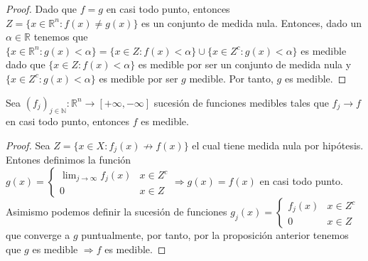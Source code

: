 \begin{proof}
    Dado que $f = g$ en casi todo punto, entonces $ Z = \{x \in \mathbb{R}^n : f(x) \neq g(x)\}$ es un conjunto de medida nula. Entonces, dado un $\alpha \in \mathbb{R}$ tenemos que $\{x \in \mathbb{R}^n : g(x) < \alpha\} = \{x \in Z : f(x) < \alpha\} \cup \{x \in Z^c : g(x) < \alpha\}$ es medible dado que $\{x \in Z : f(x) < \alpha\}$ es medible por ser un conjunto de medida nula y $\{x \in Z^c : g(x) < \alpha\}$ es medible por ser $g$ medible. Por tanto, $g$ es medible.
\end{proof}

\begin{corolario}
    Sea $(f_j)_{j \in \mathbb{N}}: \mathbb{R}^n \to [+\infty, -\infty]$ sucesión de funciones medibles tales que $f_j \to f$ en casi todo punto, entonces $f$ es medible.
\end{corolario}
\begin{proof}
    Sea $Z = \{x \in X : f_j(x) \not\to f(x)\}$ el cual tiene medida nula por hipótesis. Entones definimos la función $g(x) = \begin{cases} \lim_{j \to \infty}f_j(x) & x \in Z^c \\ 0 & x \in Z \end{cases} \Rightarrow g(x) = f(x)$ en casi todo punto. Asimismo podemos definir la sucesión de funciones $g_j(x) = \begin{cases} f_j(x) & x \in Z^c \\ 0 & x \in Z \end{cases}$ que converge a $g$ puntualmente, por tanto, por la proposición anterior tenemos que $g$ es medible $\Rightarrow f$ es medible.
\end{proof}

